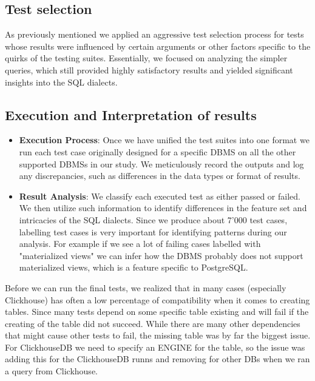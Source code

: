 \documentclass[acmsmall,nonacm]{acmart}
\begin{document}
\subsection{Test selection}
As previously mentioned we applied an aggressive test selection process for tests whose results were influenced by certain arguments or other factors specific to the quirks of the testing suites. Essentially, we focused on analyzing the simpler queries, which still provided highly satisfactory results and yielded significant insights into the SQL dialects.





\subsection{Execution and Interpretation of results}
\begin{itemize}
    \item \textbf{Execution Process}: Once we have unified the test suites into one format we run each test case originally designed for a specific DBMS on all the other supported DBMSs in our study. We meticulously record the outputs and log any discrepancies, such as differences in the data types or format of results.

    \item \textbf{Result Analysis}: We classify each executed test as either passed or failed. We then utilize such information to identify differences in the feature set and intricacies of the SQL dialects. Since we produce about 7'000 test cases, labelling test cases is very important for identifying patterns during our analysis. For example if we see a lot of failing cases labelled with "materialized views" we can infer how the DBMS probably does not support materialized views, which is a feature specific to PostgreSQL.
\end{itemize}

Before we can run the final tests, we realized that in many cases (especially Clickhouse) has often a low percentage of compatibility when it comes to creating tables. Since many tests depend on some specific table existing and will fail if the creating of the table did not succeed. While there are many other dependencies that might cause other tests to fail, the missing table was by far the biggest issue. For ClickhouseDB we need to specify an ENGINE for the table, so the issue was adding this for the ClickhouseDB runns and removing for other DBs when we ran a query from Clickhouse.
\end{document}
